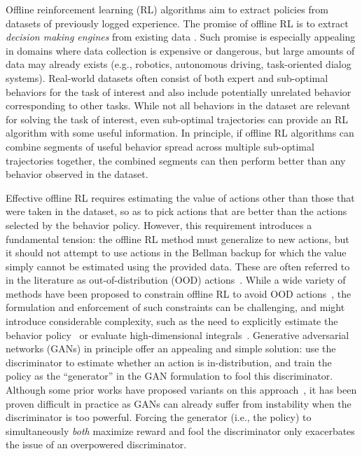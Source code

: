 
\newcommand{\name}{\text{DASCO}} 

Offline reinforcement learning (RL) algorithms aim to extract policies from datasets of previously logged experience. The promise of offline RL is to extract \textit{decision making engines} from existing data \cite{levine2020offline}. Such promise is especially appealing in domains where data collection is expensive or dangerous, but large amounts of data may already exists (e.g., robotics, autonomous driving, task-oriented dialog systems). Real-world datasets often consist of both expert and sub-optimal behaviors for the task of interest and also include potentially unrelated behavior corresponding to other tasks. While not all behaviors in the dataset are relevant for solving the task of interest, even sub-optimal trajectories can provide an RL algorithm with some useful information. In principle, if offline RL algorithms can combine segments of useful behavior spread across multiple sub-optimal trajectories together, the combined segments can then perform better than any behavior observed in the dataset. 

Effective offline RL requires estimating the value of actions other than those that were taken in the dataset, so as to pick actions that are better than the actions selected by the behavior policy. However, this requirement introduces a fundamental tension: the offline RL method must generalize to new actions, but it should not attempt to use actions in the Bellman backup for which the value simply cannot be estimated using the provided data. 
These are often referred to in the literature as out-of-distribution (OOD) actions~\cite{bear}. 
While a wide variety of methods have been proposed to constrain offline RL to avoid OOD actions~\cite{kostrikov2021offline, bcq, agarwal2019optimistic}, the formulation and enforcement of such constraints can be challenging, and might introduce considerable complexity, such as the need to explicitly estimate the behavior policy~\cite{brac} or evaluate high-dimensional integrals~\cite{kumar2020conservative}. Generative adversarial networks (GANs) in principle offer an appealing and simple solution: use the discriminator to estimate whether an action is in-distribution, and train the policy as the ``generator'' in the GAN formulation to fool this discriminator. Although some prior works have proposed variants on this approach~\cite{brac}, it has been proven difficult in practice as GANs can already suffer from instability when the discriminator is too powerful. Forcing the generator (i.e., the policy) to simultaneously \emph{both} maximize reward and fool the discriminator only exacerbates the issue of an overpowered discriminator.

